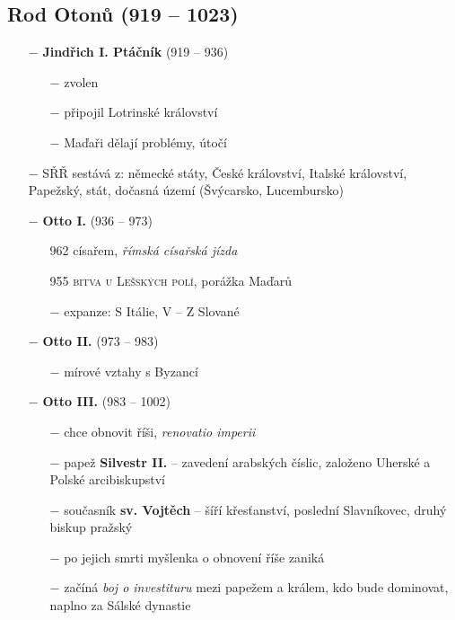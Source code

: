 \documentclass{article}
\begin{document}
\subsection*{Rod Otonů (919 -- 1023)}
\begin{itemize}
    \vspace{-0.5em}
    \setlength\itemsep{0.15em}
    \item[$-$] \textbf{Jindřich I. Ptáčník} (919 -- 936)
        \begin{itemize}
            \vspace{-0.5em}
            \setlength\itemsep{0.15em}
            \item[$-$] zvolen
            \item[$-$] připojil Lotrinské království
            \item[$-$] Maďaři dělají problémy, útočí
        \end{itemize}
    \item[$-$] SŘŘ sestává z: německé státy, České království, Italské království, Papežský, stát, dočasná území (Švýcarsko, Lucembursko)
    \item[$-$] \textbf{Otto I.} (936 -- 973)
        \begin{itemize}
            \vspace{-0.5em}
            \setlength\itemsep{0.15em}
            \item[962] císařem, \textit{římská císařská jízda}
            \item[955] \textsc{bitva u Lešských polí}, porážka Maďarů
            \item[$-$] expanze: S Itálie, V -- Z Slované
        \end{itemize}
    \item[$-$] \textbf{Otto II.} (973 -- 983)
        \begin{itemize}
            \vspace{-0.5em}
            \setlength\itemsep{0.15em}
            \item[$-$] mírové vztahy s Byzancí
        \end{itemize}
    \item[$-$] \textbf{Otto III.} (983 -- 1002)
        \begin{itemize}
            \vspace{-0.5em}
            \setlength\itemsep{0.15em}
            \item[$-$] chce obnovit říši, \textit{renovatio imperii}
            \item[$-$] papež \textbf{Silvestr II.} -- zavedení arabských číslic, založeno Uherské a Polské arcibiskupství
            \item[$-$] současník \textbf{sv. Vojtěch} -- šíří křesťanství, poslední Slavníkovec, druhý biskup pražský
            \item[$-$] po jejich smrti myšlenka o obnovení říše zaniká
            \item[$-$] začíná \textit{boj o investituru} mezi papežem a králem, kdo bude dominovat, naplno za Sálské dynastie
        \end{itemize}
\end{itemize}
\end{document}
